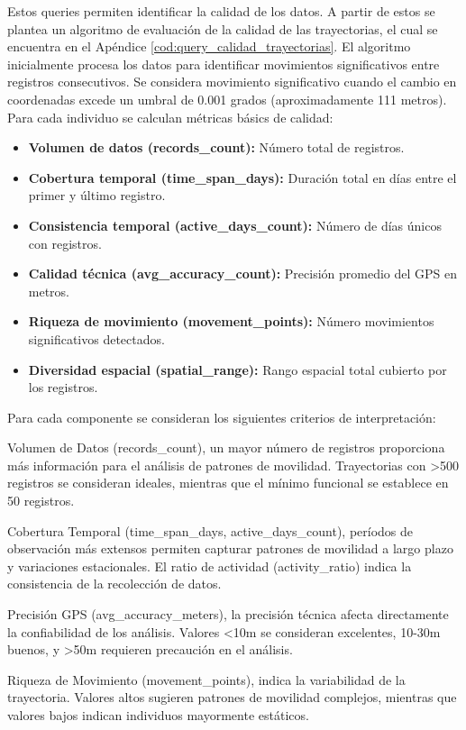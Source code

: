 Estos queries permiten identificar la calidad de los datos. A partir de estos se plantea un algoritmo de evaluación de la calidad de las trayectorias, el cual se encuentra en el Apéndice \ref{cod:query_calidad_trayectorias}. El algoritmo inicialmente procesa los datos para identificar movimientos significativos entre registros consecutivos. Se considera movimiento significativo cuando el cambio en coordenadas excede un umbral de 0.001 grados (aproximadamente 111 metros). Para cada individuo se calculan métricas básics de calidad:

\begin{itemize}
    \item \textbf{Volumen de datos (records\_count):} Número total de registros.
    \item \textbf{Cobertura temporal (time\_span\_days):} Duración total en días entre el primer y último registro.
    \item \textbf{Consistencia temporal (active\_days\_count):} Número de días únicos con registros.
    \item \textbf{Calidad técnica (avg\_accuracy\_count):} Precisión promedio del GPS en metros.
    \item \textbf{Riqueza de movimiento (movement\_points):} Número movimientos significativos detectados.
    \item \textbf{Diversidad espacial (spatial\_range):} Rango espacial total cubierto por los registros.
\end{itemize}

Para cada componente se consideran los siguientes criterios de interpretación:

Volumen de Datos (records\_count), un mayor número de registros proporciona más información para el análisis de patrones de movilidad. Trayectorias con >500 registros se consideran ideales, mientras que el mínimo funcional se establece en 50 registros.

Cobertura Temporal (time\_span\_days, active\_days\_count), períodos de observación más extensos permiten capturar patrones de movilidad a largo plazo y variaciones estacionales. El ratio de actividad (activity\_ratio) indica la consistencia de la recolección de datos.

Precisión GPS (avg\_accuracy\_meters), la precisión técnica afecta directamente la confiabilidad de los análisis. Valores <10m se consideran excelentes, 10-30m buenos, y >50m requieren precaución en el análisis.

Riqueza de Movimiento (movement\_points), indica la variabilidad de la trayectoria. Valores altos sugieren patrones de movilidad complejos, mientras que valores bajos indican individuos mayormente estáticos.

